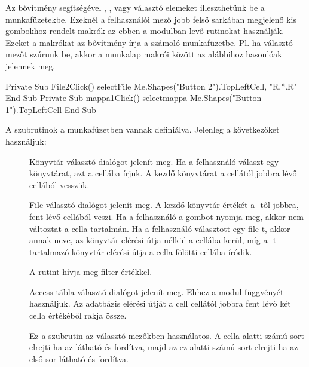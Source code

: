 Az  bővítmény segítségével , ,
vagy  választó elemeket illeszthetünk be a
munkafüzetekbe. Ezeknél a felhasználói mező jobb felső sarkában
megjelenő kis gombokhoz rendelt makrók az ebben a modulban levő
rutinokat használják. 
Ezeket a makrókat az  bővítmény írja a számoló
munkafüzetbe. Pl. ha  választó mezőt 
szúrunk be, akkor a munkalap makrói között az alábbihoz hasonlóak jelennek meg.
\begin{VBAframe}
Private Sub File2Click()
  selectFile Me.Shapes("Button 2").TopLeftCell, "R,*.R"
End Sub
Private Sub mappa1Click()
  selectmappa Me.Shapes("Button 1").TopLeftCell
End Sub
\end{VBAframe}
A  szubrutinok a  munkafüzetben vannak
definiálva. Jelenleg a következőket használjuk:
\begin{description}
\item[] Könyvtár választó dialógot jelenít
  meg. Ha a felhasználó választ egy könyvtárat, azt a  cellába
  írjuk. A kezdő könyvtárat a  cellától jobbra lévő cellából
  vesszük.  
\item[] File
  választó dialógot jelenít meg. A kezdő könyvtár értékét a -től
  jobbra, fent lévő cellából veszi. Ha a felhasználó a 
  gombot nyomja meg, akkor nem változtat a  cella tartalmán. Ha a
  felhasználó választott egy file-t, akkor annak neve, az könyvtár
  elérési útja nélkül a  cellába kerül, míg a -t
  tartalmazó könyvtár elérési útja a  cella fölötti cellába íródik.
\item[] A  rutint hívja meg
   filter értékkel.
\item[] Access
  tábla választó dialógot jelenít meg. Ehhez a  modul
   függvényét használjuk. Az 
  adatbázis elérési 
  útját a cell cellától jobbra fent lévő két cella értékéből rakja
  össze.
\item[] Ez a szubrutin az
   választó mezőkben  használatos. A 
  cella alatti  
  számú sort elrejti ha az látható és fordítva, majd az ez alatti 
  számú sort elrejti ha az első  sor látható és fordítva.  
\end{description}



